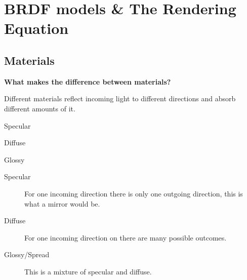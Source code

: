 \documentclass[../pbr.tex]{subfile}
\begin{document}
\section{BRDF models \& The Rendering Equation}%
\label{sec:brdf_models_&_the_rendering_equation}

\subsection{Materials}%
\label{sub:materials}

\textbf{What makes the difference between materials?}

Different materials reflect incoming light to different directions and absorb
different amounts of it.

\begin{Figure}
  \begin{center}
    \centering
    \begin{minipage}{0.3\textwidth}
      \begin{center}
        
        Specular
      \end{center}
    \end{minipage}
    \begin{minipage}{0.3\textwidth}
      \begin{center}
        
        Diffuse
      \end{center}
    \end{minipage}
    \begin{minipage}{0.3\textwidth}
      \begin{center}
        
        Glossy
      \end{center}
    \end{minipage}
  \end{center}
  \label{fig:03_1}
\end{Figure}


\begin{description}
  \item[Specular] For one incoming direction there is only one outgoing
    direction, this is what a mirror would be.
  \item[Diffuse] For one incoming direction on there are many possible
    outcomes.
  \item[Glossy/Spread] This is a mixture of specular and diffuse.
\end{description}
\end{document}
